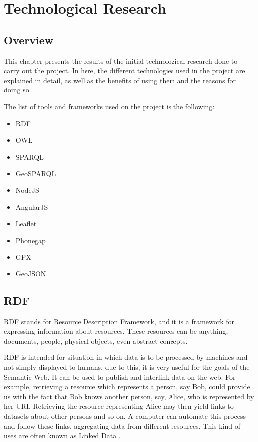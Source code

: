\chapter{Technological Research}\label{cha:research}

\section{Overview}

This chapter presents the results of the initial technological research done to carry out the project. In here, the different technologies used in the project are explained in detail, as well as the benefits of using them and the reasons for doing so.

The list of tools and frameworks used on the project is the following:

\begin{itemize}
	\item RDF
	\item OWL
	\item SPARQL
	\item GeoSPARQL
	\item NodeJS
	\item AngularJS
	\item Leaflet
	\item Phonegap
	\item GPX
	\item GeoJSON
\end{itemize}

\section{RDF}

RDF stands for Resource Description Framework, and it is a framework for expressing information about resources. These resources can be anything, documents, people, physical objects, even abstract concepts.

RDF is intended for situation in which data is to be processed by machines and not simply displayed to humans, due to this, it is very useful for the goals of the Semantic Web. It can be used to publish and interlink data on the web. For example, retrieving a resource which represents a person, say Bob, could provide us with the fact that Bob knows another person, say, Alice, who is represented by her URI. Retrieving the resource representing Alice may then yield links to datasets about other persons and so on. A computer can automate this process and follow these links, aggregating data from different resources. This kind of uses are often known as Linked Data \cite{rdfprimer11}. 

